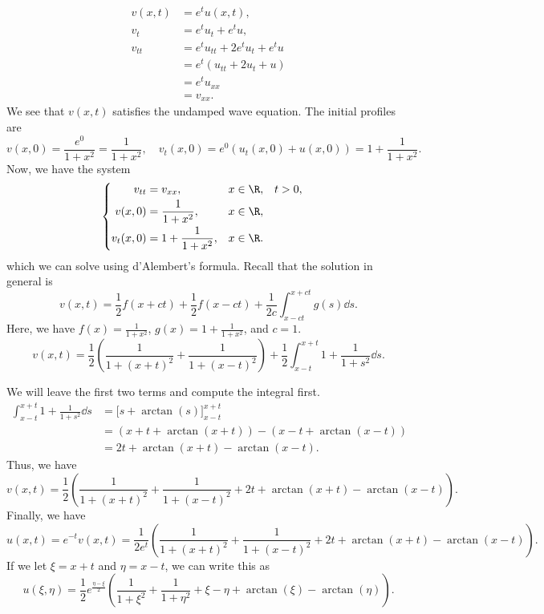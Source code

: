 \documentclass[plain]{pset}
\begin{document}
\begin{solution}
    \begin{align*}
        v(x, t) & = e^t u(x, t),                  \\
        v_t     & = e^t u_t + e^t u,              \\
        v_{tt}  & = e^t u_{tt} + 2e^t u_t + e^t u \\
                & = e^t(u_{tt} + 2u_t + u)        \\
                & = e^t u_{xx}                    \\
                & = v_{xx}.
    \end{align*}
    We see that \(v(x, t)\) satisfies the undamped wave equation. The initial profiles are
    \[v(x, 0) = \frac{e^0}{1 + x^2} = \frac{1}{1 + x^2}, \quad v_t(x, 0) = e^0(u_t(x, 0) + u(x, 0)) = 1 + \frac{1}{1 + x^2}.\]
    Now, we have the system
    \[
        \begin{cases}
            \begin{aligned}
                v_{tt}    & = v_{xx},                & x \in \R, &  & t > 0, \\
                v(x, 0)   & = \frac{1}{1 + x^2},     & x \in \R,             \\
                v_t(x, 0) & = 1 + \frac{1}{1 + x^2}, & x \in \R.
            \end{aligned}
        \end{cases}
    \]
    which we can solve using d'Alembert's formula. Recall that the solution in general is
    \[v(x, t) = \frac{1}{2}f(x + ct) + \frac{1}{2}f(x - ct) + \frac{1}{2c} \int_{x - ct}^{x + ct} g(s) \dd{s}.\]
    Here, we have \(f(x) = \frac{1}{1 + x^2}\), \(g(x) = 1 + \frac{1}{1 + x^2}\), and \(c = 1\).
    \[v(x, t) = \frac{1}{2}\left(\frac{1}{1 + (x + t)^2} + \frac{1}{1 + (x - t)^2}\right) + \frac{1}{2} \int_{x - t}^{x + t} 1 + \frac{1}{1 + s^2} \dd{s}.\]

    We will leave the first two terms and compute the integral first.
    \begin{align*}
        \int_{x - t}^{x + t} 1 + \frac{1}{1 + s^2} \dd{s} & = \bigl[s + \arctan(s)\bigr]_{x - t}^{x + t}          \\
                                                          & = (x + t + \arctan(x + t)) - (x - t + \arctan(x - t)) \\
                                                          & = 2t + \arctan(x + t) - \arctan(x - t).
    \end{align*}
    Thus, we have
    \[v(x, t) = \frac{1}{2}\left(\frac{1}{1 + (x + t)^2} + \frac{1}{1 + (x - t)^2} + 2t + \arctan(x + t) - \arctan(x - t)\right).\]
    Finally, we have
    \[u(x, t) = e^{-t}v(x, t) = \frac{1}{2e^t}\left(\frac{1}{1 + (x + t)^2} + \frac{1}{1 + (x - t)^2} + 2t + \arctan(x + t) - \arctan(x - t)\right).\]
    If we let \(\xi = x + t\) and \(\eta = x - t\), we can write this as
    \[u(\xi, \eta) = \frac{1}{2}e^{\frac{\eta - \xi}{2}}\left(\frac{1}{1 + \xi^2} + \frac{1}{1 + \eta^2} + \xi - \eta + \arctan(\xi) - \arctan(\eta)\right).\]
\end{solution}
\end{document}
